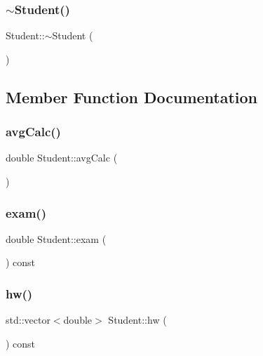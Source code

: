 \mbox{\label{class_student_a54a8ea060d6cd04222c3a2f89829f105}} 
\subsubsection{\texorpdfstring{$\sim$Student()}{~Student()}}
{\footnotesize\ttfamily Student\+::$\sim$\+Student (\begin{DoxyParamCaption}{ }\end{DoxyParamCaption})}



\subsection{Member Function Documentation}
\mbox{\label{class_student_acd913a7c6b923d65088e6aebb8aed6cf}} 
\subsubsection{\texorpdfstring{avgCalc()}{avgCalc()}}
{\footnotesize\ttfamily double Student\+::avg\+Calc (\begin{DoxyParamCaption}{ }\end{DoxyParamCaption})}

\mbox{\label{class_student_a88e3713d470d03270d764198c6f6cb17}} 
\subsubsection{\texorpdfstring{exam()}{exam()}}
{\footnotesize\ttfamily double Student\+::exam (\begin{DoxyParamCaption}{ }\end{DoxyParamCaption}) const\hspace{0.3cm}{\ttfamily [inline]}}

\mbox{\label{class_student_aa210ec262bbf18265a03b5300c6a2e54}} 
\subsubsection{\texorpdfstring{hw()}{hw()}}
{\footnotesize\ttfamily std\+::vector$<$double$>$ Student\+::hw (\begin{DoxyParamCaption}{ }\end{DoxyParamCaption}) const\hspace{0.3cm}{\ttfamily [inline]}}

